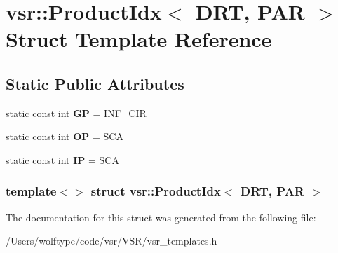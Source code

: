\hypertarget{structvsr_1_1_product_idx_3_01_d_r_t_00_01_p_a_r_01_4}{\section{vsr\-:\-:Product\-Idx$<$ D\-R\-T, P\-A\-R $>$ Struct Template Reference}
\label{structvsr_1_1_product_idx_3_01_d_r_t_00_01_p_a_r_01_4}
}
\subsection*{Static Public Attributes}
\begin{DoxyCompactItemize}
\item 
\hypertarget{structvsr_1_1_product_idx_3_01_d_r_t_00_01_p_a_r_01_4_ae996758b59542a6bbeedcd669b715e4b}{static const int {\bfseries G\-P} = I\-N\-F\-\_\-\-C\-I\-R}\label{structvsr_1_1_product_idx_3_01_d_r_t_00_01_p_a_r_01_4_ae996758b59542a6bbeedcd669b715e4b}

\item 
\hypertarget{structvsr_1_1_product_idx_3_01_d_r_t_00_01_p_a_r_01_4_a9a02501fdd018a76ca6fb3f401c9d37c}{static const int {\bfseries O\-P} = S\-C\-A}\label{structvsr_1_1_product_idx_3_01_d_r_t_00_01_p_a_r_01_4_a9a02501fdd018a76ca6fb3f401c9d37c}

\item 
\hypertarget{structvsr_1_1_product_idx_3_01_d_r_t_00_01_p_a_r_01_4_a60178d8e0875fe5d45a145c63c3c7a9c}{static const int {\bfseries I\-P} = S\-C\-A}\label{structvsr_1_1_product_idx_3_01_d_r_t_00_01_p_a_r_01_4_a60178d8e0875fe5d45a145c63c3c7a9c}

\end{DoxyCompactItemize}
\subsubsection*{template$<$$>$ struct vsr\-::\-Product\-Idx$<$ D\-R\-T, P\-A\-R $>$}



The documentation for this struct was generated from the following file\-:\begin{DoxyCompactItemize}
\item 
/\-Users/wolftype/code/vsr/\-V\-S\-R/vsr\-\_\-templates.\-h\end{DoxyCompactItemize}
